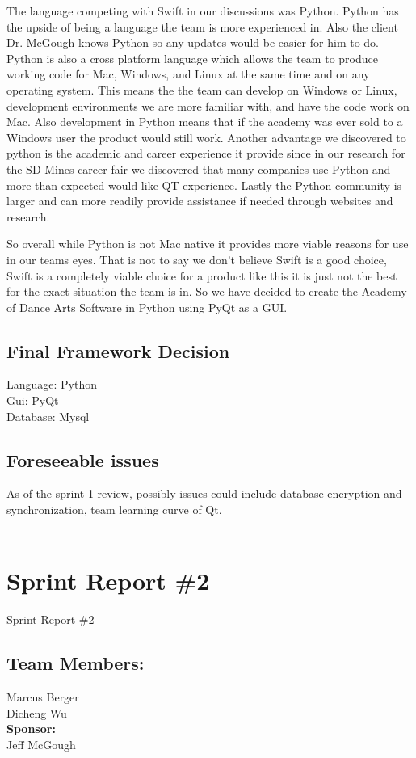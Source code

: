 The language competing with Swift in our discussions was Python. Python has the upside of being a language the team is more experienced in. Also the client Dr. McGough knows Python so any updates would be easier for him to do. Python is also a cross platform language which allows the team to produce working code for Mac, Windows, and Linux at the same time and on any operating system. This means the the team can develop on Windows or Linux, development environments we are more familiar with, and have the code work on Mac. Also development in Python means that if the academy was ever sold to a Windows user the product would still work. Another advantage we discovered to python is the academic and career experience it provide since in our research for the SD Mines career fair we discovered that many companies use Python and more than expected would like QT experience. Lastly the Python community is larger and can more readily provide assistance if needed through websites and research.

So overall while Python is not Mac native it provides more viable reasons for use in our teams eyes. That is not to say we don't believe Swift is a good choice, Swift is a completely viable choice for a product like this it is just not the best for the exact situation the team is in. So we have decided to create the  Academy of Dance Arts Software in Python using PyQt as a GUI. 

\subsection{Final Framework Decision}
Language: Python\\
Gui: PyQt\\
Database: Mysql\\

\subsection{Foreseeable issues}
As of the sprint 1 review, possibly issues could include database encryption and synchronization, team learning curve of Qt.\\
\\
  

\section{Sprint Report \#2}
Sprint Report \#2


\subsection{Team Members:}
Marcus Berger
\\Dicheng Wu\\
\textbf{Sponsor:}
\\Jeff McGough
\\


